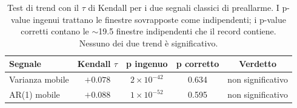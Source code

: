 \begin{table}[!ht]
    \centering
    \small
    \caption[Trend di preallarme: significatività ingenua contro corretta.]{Test di
    trend con il $\tau$ di Kendall per i due segnali classici di preallarme. I p-value
    ingenui trattano le finestre sovrapposte come indipendenti; i p-value corretti
    contano le $\sim$19.5 finestre indipendenti che il record contiene. Nessuno dei due
    trend è significativo.}
    \label{tab:ews}
    \begin{tabular}{@{}lcccc@{}}
        \toprule
        \textbf{Segnale} & \textbf{Kendall $\tau$} & \textbf{p ingenuo} & \textbf{p corretto} & \textbf{Verdetto} \\
        \midrule
        Varianza mobile & $+0.078$ & $2\times10^{-42}$ & 0.634 & non significativo \\
        AR(1) mobile     & $+0.088$ & $1\times10^{-52}$ & 0.595 & non significativo \\
        \bottomrule
    \end{tabular}
\end{table}
